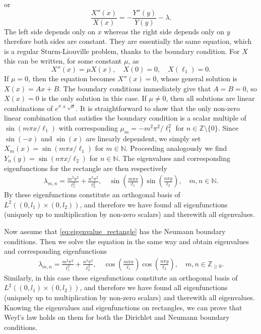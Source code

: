 \documentclass{amsart}
\theoremstyle{definition}
\def\beq{\begin{eqnarray}}
\def\eeq{\end{eqnarray}}
\newcommand*{\N}{\mathbb{N}}
\newcommand*{\Z}{\mathbb{Z}}
\begin{document}
or
\begin{equation*}
    \frac{X''(x)}{X(x)} = -\frac{Y''(y)}{Y(y)} - \lambda.
\end{equation*}
The left side depends only on $x$ whereas the right side depends only on $y$ therefore both sides are constant.  They are essentially the same equation, which is a regular Sturm-Liouville problem, thanks to the boundary condition.  For $X$ this can be written, for some constant $\mu$, as 
\[ X''(x) = \mu X(x), \quad X(0) = 0, \quad X(\ell_1) = 0.\]
If $\mu = 0$, then the equation becomes $X''(x) = 0$, whose general solution is $X(x) = Ax + B$. The boundary conditions immediately give that $A = B = 0$, so $X(x) = 0$ is the only solution in this case. If $\mu \neq 0$, then all solutions are linear combinations of $e^{x \pm \sqrt \mu }.$  It is straightforward to show that the only non-zero linear combination that satisfies the boundary condition is a scalar multiple of $\sin(m \pi x/\ell_1)$ with corresponding $\mu_m = - m^2 \pi^2/\ell_1^2$ for $n \in \Z \setminus \{0\}$.  Since $\sin(-x)$ and $\sin(x)$ are linearly dependent, we simply set $X_m(x) = \sin(m\pi x/\ell_1)$ for $m \in \N$. Proceeding analogously we find $Y_n (y) = \sin(n \pi x / \ell_2)$ for $n \in \N$.  The eigenvalues and corresponding eigenfunctions for the rectangle are then respectively 
\beq \lambda_{m,n} = \frac{m^2 \pi^2}{\ell_1^2} + \frac{n^2 \pi^2}{\ell_2^2}, \quad \sin \left( \frac{m \pi x}{\ell_1} \right) \sin \left( \frac{n \pi y}{\ell_2} \right), \quad m, n \in \N.  \label{eq:d_ev_rect} \eeq
By \cite[p. 83]{larsson2003partial} these eigenfunctions constitute an orthogonal basis of $L^2((0, l_1) \times (0, l_2))$, and therefore we have found all eigenfunctions (uniquely up to multiplication by non-zero scalars) and therewith all eigenvalues. 

Now assume that \eqref{eq:eigenvalue_rectangle} has the Neumann boundary conditions. Then we solve the equation in the same way 
and obtain eigenvalues and corresponding eigenfunctions 
\beq \lambda_{m,n} = \frac{m^2 \pi^2}{\ell_1^2} + \frac{n^2 \pi^2}{\ell_2^2}, \quad \cos \left( \frac{m \pi x}{\ell_1} \right) \cos \left( \frac{n \pi y}{\ell_2} \right), \quad m, n \in \Z_{\geq 0}.  \label{eq:n_ev_rect} \eeq
Similarly, in this case these eigenfunctions constitute an orthogonal basis of $L^2((0, l_1) \times (0, l_2))$, and therefore we have found all eigenfunctions (uniquely up to multiplication by non-zero scalars) and therewith all eigenvalues.  Knowing the eigenvalues and eigenfunctions on rectangles, we can prove that Weyl's law holds on them for both the Dirichlet and Neumann boundary conditions. 
\end{document}
